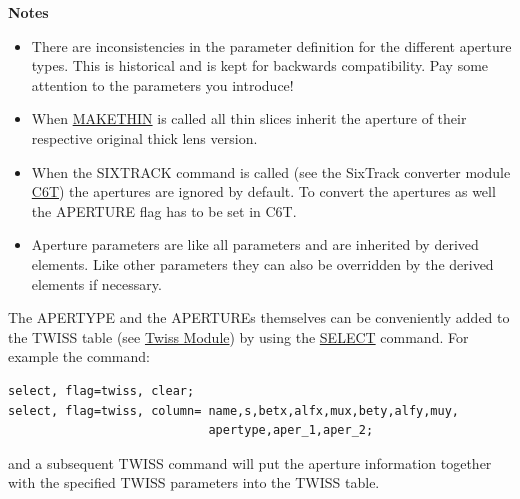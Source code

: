 {\bf Notes}
\begin{itemize}
   \item There are inconsistencies in the parameter definition for the
     different aperture types. This is historical and is kept for
     backwards compatibility. Pay some attention to the parameters you
     introduce! 
   \item When \href{../makethin/makethin.html}{MAKETHIN} is called all
     thin slices inherit the aperture of their respective original thick
     lens version.  
   \item When the SIXTRACK command is called (see the SixTrack converter
     module \href{../c6t/c6t.html}{C6T}) the apertures are ignored by
     default. To convert the apertures as well the APERTURE flag has to
     be set in C6T.  
   \item  Aperture parameters are like all parameters and are inherited
     by derived elements. Like other parameters they can also be overridden by
     the derived elements if necessary.  
\end{itemize}

The APERTYPE and the APERTUREs themselves can be conveniently added to
the TWISS table (see \href{../twiss/twiss.html}{Twiss Module}) by using
the \href{select.html}{SELECT} command. For example the command:   
\begin{verbatim}
select, flag=twiss, clear;
select, flag=twiss, column= name,s,betx,alfx,mux,bety,alfy,muy,
                            apertype,aper_1,aper_2;
\end{verbatim}
and a subsequent TWISS command will put the aperture information
together with the specified TWISS parameters into the TWISS table.   

